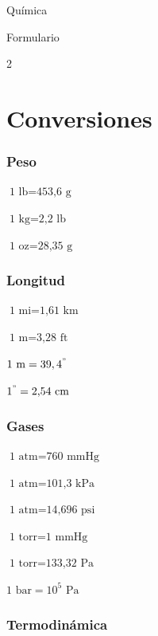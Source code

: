\begin{center}
{\Huge Química}

{\Large Formulario}
\end{center}
\tableofcontents
\newpage

\begin {multicols}{2}

\hypertarget{conversiones}{%
\section{Conversiones}\label{conversiones}}

\hypertarget{peso}{%
\subsubsection{Peso}\label{peso}}

\(\text{1 lb}=\text{453,6 g}\)

\(\text{1 kg}=\text{2,2 lb}\)

\(\text{1 oz}=\text{28,35 g}\)

\hypertarget{longitud}{%
\subsubsection{Longitud}\label{longitud}}

\(\text{1 mi}=\text{1,61 km}\)

\(\text{1 m}=\text{3,28 ft}\)

\(\text{1 m}=39,4^{"}\)

\(1^{"}=\text{2,54 cm}\)

\hypertarget{gases}{%
\subsubsection{Gases}\label{gases}}

\(\text{1 atm}=\text{760 mmHg}\)

\(\text{1 atm}=\text{101,3 kPa}\)

\(\text{1 atm}=\text{14,696 psi}\)

\(\text{1 torr}=\text{1 mmHg}\)

\(\text{1 torr}=\text{133,32 Pa}\)

\(\text{1 bar}=10^{5}\text{ Pa}\)

\hypertarget{termodinuxe1mica}{%
\subsubsection{Termodinámica}\label{termodinuxe1mica}}


\end{multicols}
